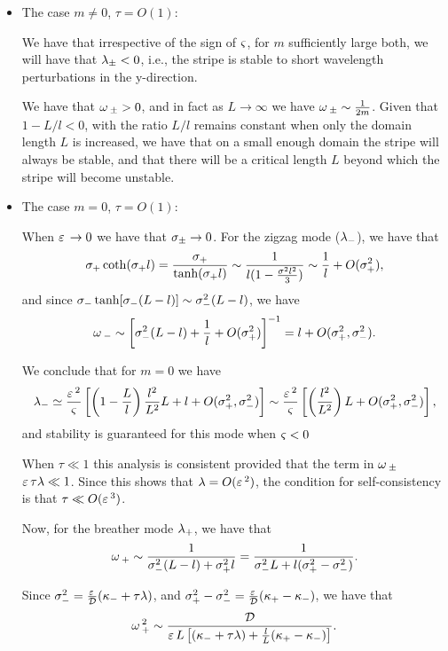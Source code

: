 \begin{itemize}
  \item{ The case $m\neq0$, $\tau=O(1)$:

	We have that irrespective of the sign of $\varsigma$, for $m$ sufficiently large both, we will have that $\lambda_{\pm}<0$, i.e., the stripe is stable to short wavelength perturbations in the y-direction.

	We have that $\omega\,_{\pm}>0$, and in fact as $L\rightarrow\infty$ we have $\omega\,_{\pm}\sim\frac{1}{2m}$. Given that $1-L/l<0$, with the ratio $L/l$ remains constant when only the domain length $L$ is increased, we have that on a small enough domain the stripe will always be stable, and that there will be a critical length $L$ beyond which the stripe will become unstable.
}

  \item{ The case $m=0$, $\tau=O(1)$:

	When $\varepsilon\,\rightarrow0$ we have that $\sigma_{\pm}\rightarrow0$. For the zigzag mode ($\lambda_-$), we have that
	\[
	  \sigma_+\coth(\sigma_+l)=\frac{\sigma_+}{\tanh(\sigma_+l)}\sim\frac{1}{l(1-\frac{\sigma^2l^2}{3})}\sim\frac{1}{l}+O(\sigma_+^2),
	\]
	and since $\sigma_-\tanh[\sigma_-(L-l)]\sim\sigma_-^2(L-l)$, we have
	\[
	  \omega\,_-\sim \left[\sigma_-^2(L-l) + \frac{1}{l} + O(\sigma_+^2) \right]^{-1} = l + O(\sigma_+^2,\sigma_-^2).
	\]

	We conclude that for $m=0$ we have
	\begin{equation*}
	  \lambda_-\simeq \frac{\varepsilon\,^2}{\varsigma}\left[\left(1 - \frac{L}{l} \right)\frac{l^2}{L^2}L + l + O(\sigma_+^2,\sigma_-^2)\right] \sim \frac{\varepsilon\,^2}{\varsigma}\left[\left(\frac{l^2}{L^2}\right)L + O(\sigma_+^2,\sigma_-^2)\right],
	\end{equation*}
	and stability is guaranteed for this mode when $\varsigma<0$

\begin{remark}
  When $\tau\ll1$ this analysis is consistent provided that the term in $\omega\,_{\pm}$ $\varepsilon\,\tau\lambda\ll1$. Since this shows that $\lambda=O(\varepsilon\,^2)$, the condition for self-consistency is that $\tau\ll O(\varepsilon\,^3)$.
\end{remark}

	Now, for the breather mode $\lambda_+$, we have that
	\[
	  \omega\,_+\sim \frac{1}{\sigma_-^2(L-l) + \sigma_+^2l} = \frac{1}{\sigma_-^2L + l(\sigma_+^2-\sigma_-^2)}.
	\]

	Since $\sigma_-^2 = \frac{\varepsilon\,}{\mathcal{D}}(\kappa_-+\tau\lambda)$, and $\sigma_+^2-\sigma_-^2 = \frac{\varepsilon\,}{\mathcal{D}}(\kappa_+-\kappa_-)$, we have that
	\[
	  \omega\,_+^2\sim\frac{\mathcal{D}}{\varepsilon\, L\left[(\kappa_-+\tau\lambda) + \frac{l}{L}(\kappa_+-\kappa_-) \right]}.
	\]
	
}
\end{itemize}
